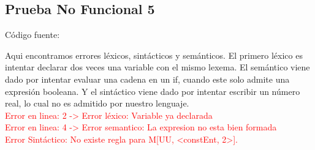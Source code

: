\documentclass{article}[a4paper]
\newcommand\tab[1][1cm]{\hspace*{#1}}
\begin{document}
\begin{appendices}
\subsection{Prueba No Funcional 5}
Código fuente:

Aqui encontramos errores léxicos, sintácticos y semánticos. El primero léxico es intentar declarar dos veces una variable con el mismo lexema. El semántico viene dado por intentar evaluar una cadena en un if, cuando este solo admite una expresión booleana. Y el sintáctico viene dado por intentar escribir un número real, lo cual no es admitido por nuestro lenguaje.\\
\tab \textcolor{red}{Error en linea: 2 -> Error léxico: Variable ya declarada}\\
\tab \textcolor{red}{Error en linea: 4 -> Error semantico: La expresion no esta bien formada}\\
\tab \textcolor{red}{Error Sintáctico: No existe regla para M[UU, <constEnt, 2>].}

\end{appendices}
\end{document}
